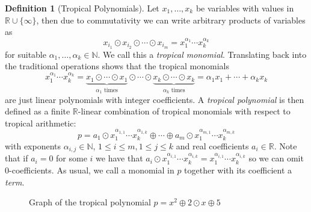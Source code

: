 \documentclass[
  paper=a4,
  titlepage,
  bibliography=totoc,
  pagesize=pdftex
]{scrartcl}
\numberwithin{figure}{section}
\numberwithin{equation}{section}
\numberwithin{table}{section}
\newcommand*\setR{\mathds{R}}
\newcommand*\setN{\mathds{N}}
\theoremstyle{definition}
\newtheorem{definition}{Definition}
\numberwithin{definition}{section}
\begin{document}
\begin{definition}[Tropical Polynomials]
  \label{def:tropPoly}
  Let $x_1, \dots, x_k$ be variables with values in $\setR\cup\{\infty\}$, then due to
  commutativity we can write arbitrary products of variables as
  \[
    x_{i_1} \odot x_{i_2} \odot \cdots \odot x_{i_m}
    = x_1^{\alpha_1} \cdots x_k^{\alpha_k}
  \]
  for suitable $\alpha_1, \dots, \alpha_k \in \setN$. We call this a \emph{tropical
  monomial}. Translating back into the traditional operations shows that the tropical
  monomials
  \[
    x_1^{\alpha_1} \cdots x_k^{\alpha_k} =
    \underbrace{x_1\odot\cdots\odot x_1}_{\alpha_1 \text{ times}}
    \odot\cdots\odot
    \underbrace{x_k\odot\cdots\odot x_k}_{\alpha_k \text{ times}}
    = \alpha_1x_1 + \cdots + \alpha_kx_k
  \]
  are just linear polynomials with integer coefficients. A \emph{tropical polynomial} is
  then defined as a finite $\setR$-linear combination of tropical monomials with respect
  to tropical arithmetic:
  \[
    p = a_1 \odot x_1^{\alpha_{1,1}}\cdots x_k^{\alpha_{1,k}} \oplus \cdots \oplus
    a_m \odot x_1^{\alpha_{m,1}}\cdots x_k^{\alpha_{m,k}}
  \]
  with exponents $\alpha_{i,j} \in \setN$, $1\leq i \leq m, 1\leq j \leq k$ and real
  coefficients $a_i \in \setR$. Note that if $a_i = 0$ for some $i$ we have that $a_i\odot
  x_1^{\alpha_{i,1}}\cdots x_k^{\alpha_{i,k}} = x_1^{\alpha_{i,1}}\cdots
  x_k^{\alpha_{i,k}}$ so we can omit $0$-coefficients. As usual, we call a monomial in $p$
  together with its coefficient a \emph{term}.
\end{definition}

\begin{figure}[tbh]
  \centering
  \caption{Graph of the tropical polynomial $p=x^2\oplus 2\odot x \oplus 5$}
  \label{fig:tropPolyPlot}
\end{figure}
\end{document}
